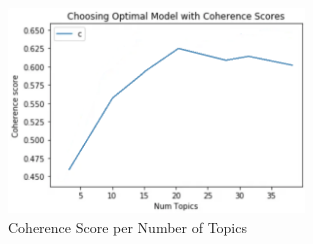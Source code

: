 \documentclass[12pt]{article}
\begin{document}
\newline

\begin{figure}
\begin{center}
\includegraphics[width=0.7\textwidth]{figures/image17.png}
\caption{Coherence Score per Number of Topics}
\label{fig:img_coherence_score}
\end{center}
\end{figure}
\end{document}
